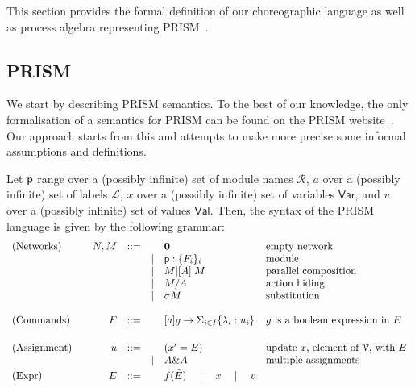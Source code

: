 This section provides the formal definition of our choreographic
language as well as process algebra representing
PRISM~\cite{prismsemantics}.

\subsection{PRISM} We start by describing PRISM semantics. To the best
of our knowledge, the only formalisation of a semantics for PRISM can
be found on the PRISM website~\cite{prismemantics}. Our approach
starts from this and attempts to make more precise some informal
assumptions and definitions.

\smallskip

 Let $\textsf{p}$ range over a (possibly infinite) set of
module names $\mathcal R$, $a$ over a (possibly infinite) set of
labels $\mathcal L$, $x$ over a (possibly infinite) set of variables
$\mathsf{Var}$, and $v$ over a (possibly infinite) set of values
$\mathsf{Val}$. Then, the syntax of the PRISM language is given by the
following grammar:
\begin{displaymath}
  \begin{array}{lrllll}
    \text{(Networks)}  \quad
    & N, M  & ::=  &      & \mathbf{0} & \text{empty network}\\
    &       &      & \mid & \textsf{p}:\{F_i\}_i & \text{module}\\
    &       &      & \mid & M |[A]| M & \text{parallel composition}\\
    &       &      & \mid & M/A        & \text{action hiding}\\
    &       &      & \mid & \sigma M   & \text{substitution}\\
    \\
    \text{(Commands)}  \quad
    & F     & ::=  &      & [a] g \rightarrow \Sigma_{i\in I}\{\lambda_i: u_i\}
                                  & \text{$g$ is a boolean expression in $E$} \\
    \\[1mm]
    \text{(Assignment)} \quad
    & u     & ::=  &      & (x' = E) & \text{update $x$, element of $\mathcal V$, with $E$}\\
    &       &      & \mid & A \& A   & \text{multiple assignments}
    \\[1mm]
    \text{(Expr)}\quad
    & E     & ::= &       & f(\tilde E)\quad\mid\quad x\quad\mid\quad v
  \end{array}
\end{displaymath}
